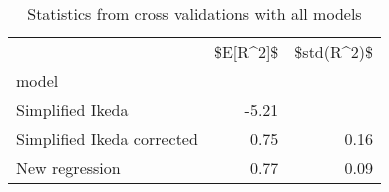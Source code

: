 
\begin{table}[H]
    \centering
    \caption{Statistics from cross validations with all models}
   \begin{tabular}{lrr}
\toprule
{} &  \$E[R\textasciicircum 2]\$ &  \$std(R\textasciicircum 2)\$ \\
model                      &           &             \\
\midrule
Simplified Ikeda           &     -5.21 &             \\
Simplified Ikeda corrected &      0.75 &        0.16 \\
New regression             &      0.77 &        0.09 \\
\bottomrule
\end{tabular}

    \label{tab:crossvalidation}
\end{table}
    